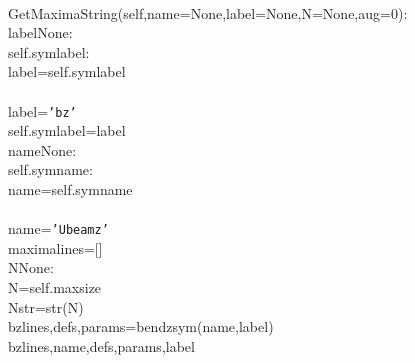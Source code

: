 {{\begin{tabbing}
\\
\hspace{5pt}GetMaximaString(self,name=None,label=None,N=None,aug=0):\\
\hspace{5pt}label\hspace{5pt}None:
\\
\hspace{5pt}self.symlabel:
\\
\hspace{80pt}label=self.symlabel
\\
\\
\hspace{80pt}label={\texttt{{'}bz{'}}}
\\
\hspace{80pt}self.symlabel=label
\\
\hspace{5pt}name\hspace{5pt}None:
\\
\hspace{5pt}self.symname:
\\
\hspace{80pt}name=self.symname
\\
\\
\hspace{80pt}name={\texttt{{'}Ubeamz{'}}}
\\
\hspace{40pt}maximalines={[}{]}
\\
\hspace{5pt}N\hspace{5pt}None:
\\
\hspace{60pt}N=self.maxsize
\\
\hspace{40pt}Nstr=str(N)
\\
\hspace{40pt}bzlines,defs,params=bendzsym(name,label)
\\
\hspace{5pt}bzlines,\hspace{5pt}name,\hspace{5pt}defs,\hspace{5pt}params,\hspace{5pt}label
\\


\end{tabbing}}}
